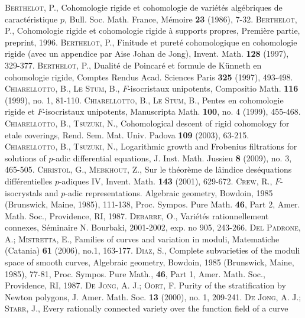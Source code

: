 \documentclass[11pt]{amsart}
\begin{document}
\begin{thebibliography}{99}
 \textsc{Berthelot, P.}, Cohomologie rigide et cohomologie de vari\'et\'es alg\'ebriques de caract\'eristique $p$,
Bull. Soc. Math.  France, M\'emoire \textbf{23} (1986), 7-32.
 \textsc{Berthelot, P.}, Cohomologie rigide et cohomologie rigide 
\`a supports propres, Premi\`ere partie, preprint, 1996. 
 \textsc{Berthelot, P.}, Finitude et puret\'e cohomologique en cohomologie  rigide 
(avec un appendice par Aise Johan de Jong), Invent. Math. \textbf{128} (1997), 329-377.
 \textsc{Berthelot, P.}, Dualit\'e de Poincar\'e et formule de K\"unneth en cohomologie rigide,
Comptes Rendus Acad. Sciences Paris \textbf{325} (1997), 493-498.
 \textsc{Chiarellotto, B., Le Stum, B.}, 
$F$-isocristaux unipotents, Compositio Math. \textbf{116} (1999), no. 1, 81-110.
 \textsc{Chiarellotto, B., Le Stum, B.}, Pentes en cohomologie rigide et $F$-isocristaux unipotents, 
Manuscripta Math. \textbf{100}, no. 4  (1999), 455-468.
 \textsc{Chiarellotto, B., Tsuzuki, N.}, Cohomological descent of rigid cohomology for etale coverings, 
Rend. Sem. Mat. Univ. Padova \textbf{109} (2003), 63-215.
 \textsc{Chiarellotto, B., Tsuzuki, N.}, 
Logarithmic growth and Frobenius filtrations for solutions of $p$-adic differential equations, J. Inst. Math. Jussieu 
\textbf{8} (2009), no. 3, 465-505.
 \textsc{Christol, G., Mebkhout, Z.}, Sur le th\'eor\`eme de lâindice des\'equations 
diff\'erentielles $p$-adiques IV, Invent. Math. \textbf{143} (2001), 629-672.
 \textsc{Crew, R.}, $F$-isocrystals and $p$-adic representations. Algebraic geometry, Bowdoin, 1985 
(Brunswick, Maine, 1985), 111-138, Proc. Sympos. Pure Math. \textbf{46}, Part 2, Amer. Math. Soc., Providence, RI, 1987.
 \textsc{Debarre, O.}, Vari\'et\'es rationnellement connexes, S\'eminaire N. Bourbaki, 2001-2002, exp. no 905, 243-266.
 \textsc{Del Padrone, A.; Mistretta, E.}, 
Families of curves and variation in moduli, Matematiche (Catania) \textbf{61} (2006), no.1, 163-177.
 \textsc{Diaz, S.}, 
Complete subvarieties of the moduli space of smooth curves, 
Algebraic geometry, Bowdoin, 1985 (Brunswick, Maine, 1985), 77-81, Proc. Sympos. Pure Math., 
\textbf{46}, Part 1, Amer. Math. Soc., Providence, RI, 1987.
 \textsc{De Jong, A. J.; Oort, F.} 
Purity of the stratification by Newton polygons, J. Amer. Math. Soc. \textbf{13} (2000), no. 1, 209-241.
 \textsc{De Jong, A. J.; Starr, J.}, Every rationally connected variety over the function field of a curve 

\end{thebibliography}
\end{document}

